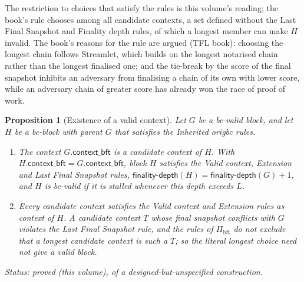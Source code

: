 \documentclass[11pt,a4paper]{article}
\newtheorem{proposition}[theorem]{Proposition}
\theoremstyle{definition}
\newcommand{\bft}{\mathrm{bft}}
\newcommand{\Pibft}{\Pi_{\bft}}
\newcommand{\contextbft}{\mathsf{context\_bft}}
\newcommand{\finalitydepth}{\mathsf{finality\text{-}depth}}
\begin{document}
The restriction to choices that satisfy the rules is this volume's reading;
the book's rule chooses among all candidate contexts, a set defined without
the Last Final Snapshot and Finality depth rules, of which a longest member
can make $H$ invalid. The book's reasons for the rule are argued (TFL
book): choosing the longest chain follows Streamlet, which builds on the
longest notarised chain rather than the longest finalised one; and
the tie-break by the score of the final snapshot inhibits an adversary from
finalising a chain of its own with lower score, while an adversary chain of
greater score has already won the race of proof of work.

\begin{proposition}[Existence of a valid context]\label{prop:context-exists}
Let $G$ be a bc-valid block, and let $H$ be a bc-block with parent $G$ that
satisfies the Inherited origbc rules.
\begin{enumerate}[label=(\roman*)]
\item The context $G.\contextbft$ is a candidate context of $H$. With
  $H.\contextbft = G.\contextbft$, block $H$ satisfies the Valid context,
  Extension and Last Final Snapshot rules, $\finalitydepth(H) =
  \finalitydepth(G) + 1$, and $H$ is bc-valid if it is stalled whenever
  this depth exceeds $L$.
\item Every candidate context satisfies the Valid context and Extension
  rules as context of $H$. A candidate context $T$ whose final snapshot
  conflicts with $G$ violates the Last Final Snapshot rule, and the rules of
  $\Pibft$ do not exclude that a longest candidate context is such a $T$; so
  the literal longest choice need not give a valid block.
\end{enumerate}

Status: proved (this volume), of a designed-but-unspecified construction.
\end{proposition}
\end{document}
